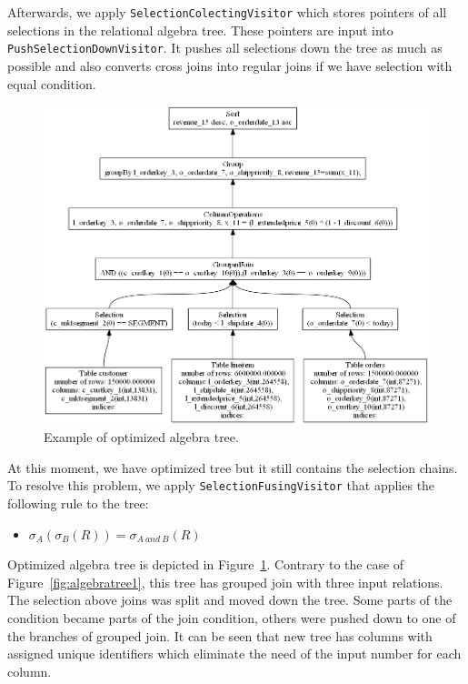 Afterwards, we apply \texttt{SelectionColectingVisitor} which stores pointers of all selections in the relational algebra tree. These pointers are input into \texttt{Push\-Selection\-Down\-Visitor}. It pushes all selections down the tree as much as possible and also converts cross joins into regular joins if we have selection with equal condition.
\begin{figure}[h!]
  \centering
    \includegraphics[width=1.0\textwidth]{algebratree2}

      \caption{Example of optimized algebra tree.}
          \label{fig:algebratree2}
\end{figure}
At this moment, we have optimized tree but it still contains the selection chains. To resolve this problem, we apply \texttt{SelectionFusingVisitor} that applies the following rule to the tree:
\begin{itemize}
\item $\sigma_{A}(\sigma_{B}(R))=\sigma_{A~and~B}(R)$
\end{itemize}

Optimized algebra tree is depicted in Figure~\ref{fig:algebratree2}. Contrary to the case of Figure~\ref{fig:algebratree1}, this tree has grouped join with three input relations. The selection above joins was split and moved down the tree. Some parts of the condition became parts of the join condition, others were pushed down to one of the branches of grouped join. It can be seen that new tree has columns with assigned unique identifiers which eliminate the need of the input number for each column.

